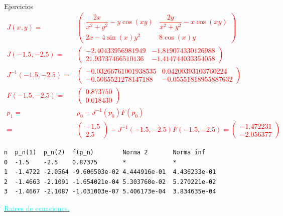 \begin{frame}[fragile]{Ejercicios}
\small
\textcolor{red}{
\begin{align*}
J(x,y)=&\begin{pmatrix}
\dfrac{2x}{x^2+y^2}-y\cos(xy) & \dfrac{2y}{x^2+y^2}-x\cos(xy)\\
2x-4\sin(x)y^2 & 8 \cos(x)y 
\end{pmatrix}\\
J(-1.5,-2.5)=&
\begin{pmatrix}
 - 2.40433956981949  & - 1.819074330126988\\
 21.93737466510136   & - 1.414744033354058
\end{pmatrix}\\
J^{-1}(-1.5,-2.5)=&
\begin{pmatrix}
-0.03266761001938535 &  0.04200393103760224\\
-0.5065521278147188 &  - 0.05551818955887632
\end{pmatrix}\\
F(-1.5,-2.5)=&
\begin{pmatrix}
0.873750\\
0.018430
\end{pmatrix}\\
p_1=&p_0-J^{-1}(p_0)F(p_0)\\
=&
\begin{pmatrix}
-1.5\\
2.5
\end{pmatrix}
-J^{-1}(-1.5,-2.5)F(-1.5,-2.5)=
\begin{pmatrix}
-1.472231\\
-2.056377
\end{pmatrix}
\end{align*}}
\small
\begin{lstlisting}[style=mystyle,backgroundcolor=\color{gray!30}]
n  p_n(1)  p_n(2)  f(p_n)        Norma 2       Norma inf
0  -1.5    -2.5    0.87375       *             *
1  -1.4722 -2.0564 -9.606503e-02 4.444916e-01  4.436233e-01
2  -1.4663 -2.1091 -1.654021e-04 5.303760e-02  5.270221e-02
3  -1.4667 -2.1087 -1.031003e-07 5.406173e-04  3.834635e-04
\end{lstlisting}
\normalsize
\hyperlink{RetornoTeoremaRaices10}{\textcolor{cyan}{Raices de ecuaciones.}} 
\end{frame}